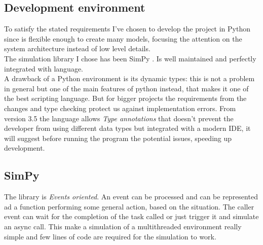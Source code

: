 \subsection{Development environment}
To satisfy the stated requirements I've chosen to develop the project in Python
since is flexible enough to create many models, focusing the attention on the
system architecture instead of low level details. \\
The simulation library I chose has been SimPy \cite{simpy}. Is well maintained
and perfectly integrated with language. \\
A drawback of a Python environment is its dynamic types: this is not a problem
in general but one of the main features of python instead, that makes it one of
the best scripting language. But for bigger projects the requirements from the
changes and type checking protect us against implementation errors. From version
3.5 the language allows \textit{Type annotations} that doesn't prevent the
developer from using different data types but integrated with a modern IDE, it
will suggest before running the program the potential issues, speeding up
development.

\subsection{SimPy}
The library is \textit{Events oriented}. An event can be processed and can be
represented ad a function performing some general action, based on the
situation. The caller event can wait for the completion of the task called or
just trigger it and simulate an async call. This make a simulation of a
multithreaded environment really simple and few lines of code are required for
the simulation to work. \\

